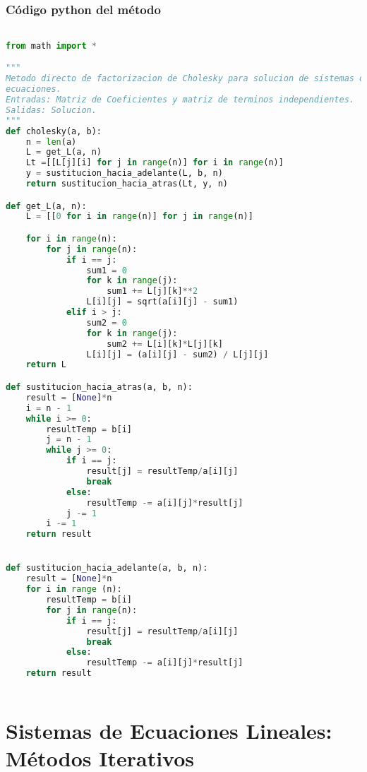 \documentclass[12pt]{article}
\begin{document}
\subsubsection{Código python del método}
\begin{lstlisting}[language=Python, caption=Implementación del método de Factorizacion de Cholesky en Python] 

from math import *

"""
Metodo directo de factorizacion de Cholesky para solucion de sistemas de 
ecuaciones.
Entradas: Matriz de Coeficientes y matriz de terminos independientes.
Salidas: Solucion.
"""
def cholesky(a, b):
    n = len(a)
    L = get_L(a, n)
    Lt =[[L[j][i] for j in range(n)] for i in range(n)]
    y = sustitucion_hacia_adelante(L, b, n)
    return sustitucion_hacia_atras(Lt, y, n)

def get_L(a, n):
    L = [[0 for i in range(n)] for j in range(n)]

    for i in range(n):
        for j in range(n):
            if i == j:
                sum1 = 0
                for k in range(j):
                    sum1 += L[j][k]**2
                L[i][j] = sqrt(a[i][j] - sum1)
            elif i > j:
                sum2 = 0
                for k in range(j):
                    sum2 += L[i][k]*L[j][k]
                L[i][j] = (a[i][j] - sum2) / L[j][j]
    return L

def sustitucion_hacia_atras(a, b, n):
    result = [None]*n
    i = n - 1
    while i >= 0:
        resultTemp = b[i]
        j = n - 1
        while j >= 0:
            if i == j:
                result[j] = resultTemp/a[i][j]
                break
            else:
                resultTemp -= a[i][j]*result[j]
            j -= 1
        i -= 1
    return result


def sustitucion_hacia_adelante(a, b, n):
    result = [None]*n
    for i in range (n):
        resultTemp = b[i]
        for j in range(n):
            if i == j:
                result[j] = resultTemp/a[i][j]
                break
            else:
                resultTemp -= a[i][j]*result[j]
    return result
    
\end{lstlisting}



\iffalse
\section{Sistemas de Ecuaciones Lineales: Métodos Iterativos}
\end{document}
